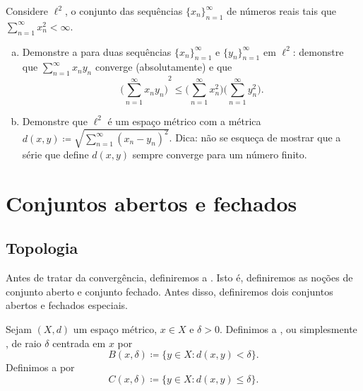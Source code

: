 \begin{samepage}
\begin{exercise}
Considere $\ell^2$, o conjunto das sequências $\{ x_n \}_{n=1}^\infty$ de
números reais tais que $\sum_{n=1}^\infty x_n^2 < \infty$.
\begin{enumerate}[a)]
\item
Demonstre a  para duas sequências
$\{x_n \}_{n=1}^\infty$ e $\{ y_n \}_{n=1}^\infty$ em $\ell^2$: demonstre
que $\sum_{n=1}^\infty x_n y_n$ converge (absolutamente) e que
\begin{equation*}
{\biggl( \sum_{n=1}^\infty x_n y_n \biggr)}^2
\leq
\biggl(\sum_{n=1}^\infty x_n^2 \biggr)
\biggl(\sum_{n=1}^\infty y_n^2 \biggr) .
\end{equation*}
\item
Demonstre que $\ell^2$ é um espaço métrico com a métrica
$d(x,y) \coloneqq \sqrt{\sum_{n=1}^\infty {(x_n-y_n)}^2}$.
Dica: não se esqueça de mostrar que a série que define $d(x,y)$ sempre
converge para um número finito.
\end{enumerate}
\end{exercise}
\end{samepage}


\sectionnewpage
\section{Conjuntos abertos e fechados}
\label{sec:mettop}



\subsection{Topologia}

Antes de tratar da convergência,
definiremos a \emph{}.
Isto é,
definiremos as noções de conjunto aberto e conjunto fechado.
Antes disso,
definiremos dois conjuntos abertos e fechados especiais.

\begin{defn}
Sejam $(X,d)$ um espaço métrico, $x \in X$ e $\delta > 0$. Definimos a
\emph{}, ou simplesmente \emph{}, de raio
$\delta$ centrada em $x$ por
\begin{equation*}
B(x,\delta) \coloneqq \bigl\{ y \in X : d(x,y) < \delta \bigr\} .
\end{equation*}
Definimos a \emph{} por
\begin{equation*}
C(x,\delta) \coloneqq \bigl\{ y \in X : d(x,y) \leq \delta \bigr\} .
\end{equation*}
\end{defn}

